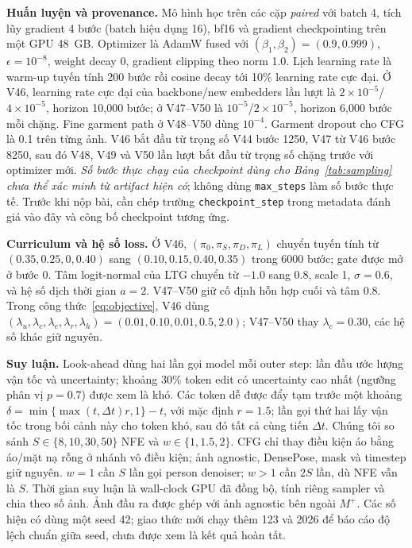 \documentclass[11pt,a4paper]{article}
\begin{document}
\textbf{Huấn luyện và provenance.} Mô hình học trên các cặp \textit{paired} với batch 4, tích lũy gradient 4 bước (batch hiệu dụng 16), bf16 và gradient checkpointing trên một GPU 48~GB. Optimizer là AdamW fused với \((\beta_1,\beta_2)=(0.9,0.999)\), \(\epsilon=10^{-8}\), weight decay 0, gradient clipping theo norm 1.0. Lịch learning rate là warm-up tuyến tính 200 bước rồi cosine decay tới 10\% learning rate cực đại. Ở V46, learning rate cực đại của backbone/new embedders lần lượt là \(2\times10^{-5}\)/\(4\times10^{-5}\), horizon 10{,}000 bước; ở V47--V50 là \(10^{-5}\)/\(2\times10^{-5}\), horizon 6{,}000 bước mỗi chặng. Fine garment path ở V48--V50 dùng \(10^{-4}\). Garment dropout cho CFG là 0.1 trên từng ảnh. V46 bắt đầu từ trọng số V44 bước 1250, V47 từ V46 bước 8250, sau đó V48, V49 và V50 lần lượt bắt đầu từ trọng số chặng trước với optimizer mới. \emph{Số bước thực chạy của checkpoint dùng cho Bảng~\ref{tab:sampling} chưa thể xác minh từ artifact hiện có}; không dùng \texttt{max\_steps} làm số bước thực tế. Trước khi nộp bài, cần chép trường \texttt{checkpoint\_step} trong metadata đánh giá vào đây và công bố checkpoint tương ứng.

\textbf{Curriculum và hệ số loss.} Ở V46, \((\pi_0,\pi_S,\pi_D,\pi_L)\) chuyển tuyến tính từ \((0.35,0.25,0,0.40)\) sang \((0.10,0.15,0.40,0.35)\) trong 6000 bước; gate được mở ở bước 0. Tâm logit-normal của LTG chuyển từ \(-1.0\) sang \(0.8\), scale 1, \(\sigma=0.6\), và hệ số dịch thời gian \(a=2\). V47--V50 giữ cố định hỗn hợp cuối và tâm \(0.8\). Trong công thức~\eqref{eq:objective}, V46 dùng \((\lambda_u,\lambda_c,\lambda_e,\lambda_r,\lambda_h)=(0.01,0.10,0.01,0.5,2.0)\); V47--V50 thay \(\lambda_c=0.30\), các hệ số khác giữ nguyên.

\textbf{Suy luận.} Look-ahead \cite{pf} dùng hai lần gọi model mỗi outer step: lần đầu ước lượng vận tốc và uncertainty; khoảng 30\% token edit có uncertainty cao nhất (ngưỡng phân vị \(p=0.7\)) được xem là khó. Các token dễ được đẩy tạm trước một khoảng \(\delta=\min\{\max(t,\Delta t)r,1\}-t\), với mặc định \(r=1.5\); lần gọi thứ hai lấy vận tốc trong bối cảnh này cho token khó, sau đó tất cả cùng tiến \(\Delta t\). Chúng tôi so sánh \(S\in\{8,10,30,50\}\) NFE và \(w\in\{1,1.5,2\}\). CFG chỉ thay điều kiện áo bằng áo/mặt nạ rỗng ở nhánh vô điều kiện; ảnh agnostic, DensePose, mask và timestep giữ nguyên. \(w=1\) cần \(S\) lần gọi person denoiser; \(w>1\) cần \(2S\) lần, dù NFE vẫn là \(S\). Thời gian suy luận là wall-clock GPU đã đồng bộ, tính riêng sampler và chia theo số ảnh. Ảnh đầu ra được ghép với ảnh agnostic bên ngoài \(M^+\). Các số hiện có dùng một seed 42; giao thức mới chạy thêm 123 và 2026 để báo cáo độ lệch chuẩn giữa seed, chưa được xem là kết quả hoàn tất.
\end{document}
